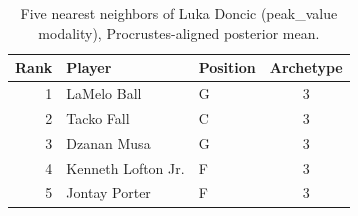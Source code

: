 \begin{table}[htbp]
  \centering\small
  \begin{tabular}{rllc}
    \toprule
    Rank & Player & Position & Archetype \\
    \midrule
    1 & LaMelo Ball & G & 3 \\
    2 & Tacko Fall & C & 3 \\
    3 & Dzanan Musa & G & 3 \\
    4 & Kenneth Lofton Jr. & F & 3 \\
    5 & Jontay Porter & F & 3 \\
    \bottomrule
  \end{tabular}
  \caption{Five nearest neighbors of Luka Doncic (peak_value modality), Procrustes-aligned posterior mean.}
  \label{tab:Luka_Doncic_neighbors_peak_value}
\end{table}

